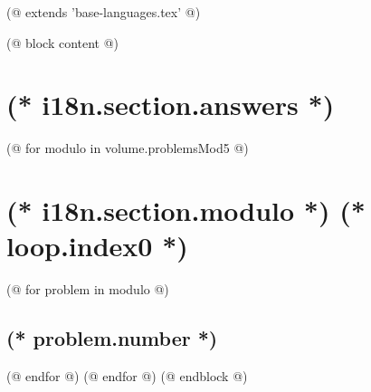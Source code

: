 (@ extends 'base-languages.tex' @)

(@ block content @)
    \pagestyle{main}
    \thispagestyle{first}
    \vspace*{19mm}
   
    \section{(* i18n.section.answers *)}
    \pagestyle{answers}
    (@ for modulo in volume.problemsMod5 @)
        \newpage%
        \section{(* i18n.section.modulo *) (* loop.index0 *)}
        (@ for problem in modulo @)%
            \setcounter{volume}{(* volume.number *)}%
            \setcounter{problem}{(* problem.number *)}%
            \subsection{(* problem.number *)}%
        (@ endfor @)
    (@ endfor @)
(@ endblock @)    
